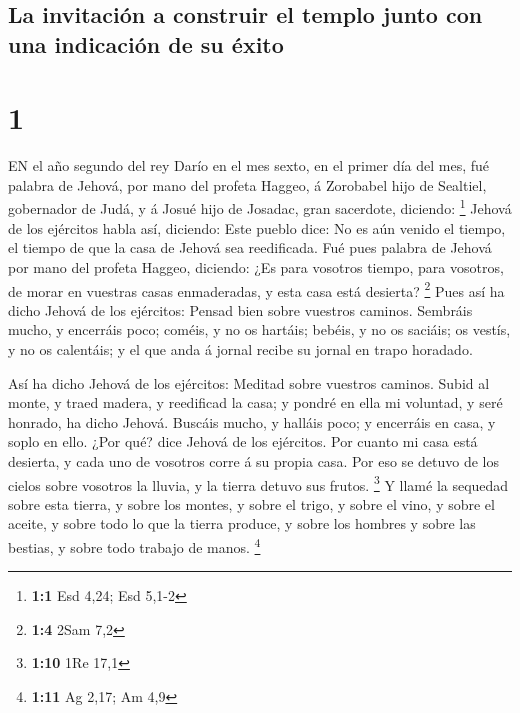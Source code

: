 \hypertarget{la-invitaciuxf3n-a-construir-el-templo-junto-con-una-indicaciuxf3n-de-su-uxe9xito}{%
\subsection{La invitación a construir el templo junto con una indicación
de su
éxito}\label{la-invitaciuxf3n-a-construir-el-templo-junto-con-una-indicaciuxf3n-de-su-uxe9xito}}

\hypertarget{section}{%
\section{1}\label{section}}

 EN el año segundo del rey Darío en el mes sexto, en el
primer día del mes, fué palabra de Jehová, por mano del profeta Haggeo,
á Zorobabel hijo de Sealtiel, gobernador de Judá, y á Josué hijo de
Josadac, gran sacerdote, diciendo: \footnote{\textbf{1:1} Esd 4,24; Esd
  5,1-2}  Jehová de los ejércitos habla así, diciendo: Este
pueblo dice: No es aún venido el tiempo, el tiempo de que la casa de
Jehová sea reedificada.  Fué pues palabra de Jehová por mano
del profeta Haggeo, diciendo:  ¿Es para vosotros tiempo,
para vosotros, de morar en vuestras casas enmaderadas, y esta casa está
desierta? \footnote{\textbf{1:4} 2Sam 7,2}  Pues así ha
dicho Jehová de los ejércitos: Pensad bien sobre vuestros caminos.
 Sembráis mucho, y encerráis poco; coméis, y no os hartáis;
bebéis, y no os saciáis; os vestís, y no os calentáis; y el que anda á
jornal recibe su jornal en trapo horadado.

 Así ha dicho Jehová de los ejércitos: Meditad sobre
vuestros caminos.  Subid al monte, y traed madera, y
reedificad la casa; y pondré en ella mi voluntad, y seré honrado, ha
dicho Jehová.  Buscáis mucho, y halláis poco; y encerráis en
casa, y soplo en ello. ¿Por qué? dice Jehová de los ejércitos. Por
cuanto mi casa está desierta, y cada uno de vosotros corre á su propia
casa.  Por eso se detuvo de los cielos sobre vosotros la
lluvia, y la tierra detuvo sus frutos. \footnote{\textbf{1:10} 1Re 17,1}
 Y llamé la sequedad sobre esta tierra, y sobre los montes,
y sobre el trigo, y sobre el vino, y sobre el aceite, y sobre todo lo
que la tierra produce, y sobre los hombres y sobre las bestias, y sobre
todo trabajo de manos. \footnote{\textbf{1:11} Ag 2,17; Am 4,9}

